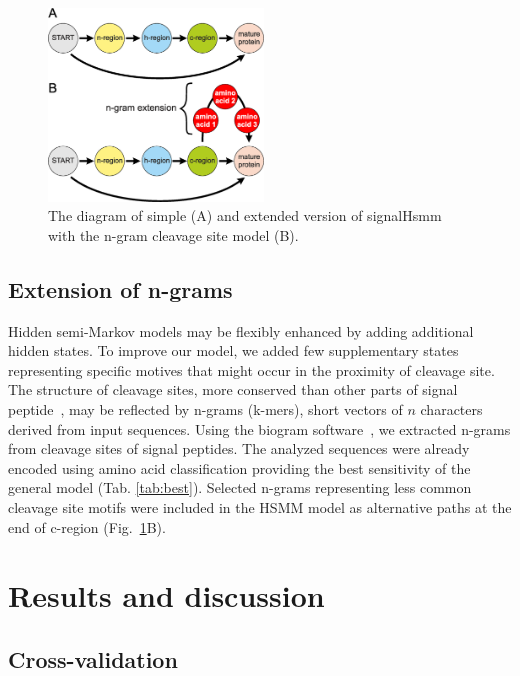 \documentclass[10pt,letterpaper]{article}
\begin{document}

\begin{figure}[ht]\centering
\includegraphics[width=0.51\textwidth]{figures/HSMMs.eps}
\caption{The diagram of simple (A) and extended version of signalHsmm with the n-gram cleavage site model (B).}
\label{fig:ngramext}
\end{figure}

    
\subsection*{Extension of n-grams}

Hidden semi-Markov models may be flexibly enhanced by adding additional hidden states. To improve our model, we added few supplementary states representing specific motives that might occur in the proximity of cleavage site. The structure of cleavage sites, more conserved than other parts of signal peptide~\cite{2004hillerpredisi}, may be reflected by n-grams (k-mers), short vectors of $n$ characters derived from input sequences. Using the biogram software~\cite{biogramPackage}, we extracted n-grams from cleavage sites of signal peptides. The analyzed sequences were already encoded using amino acid classification providing the best sensitivity of the general model (Tab. \ref{tab:best}). Selected n-grams representing less common cleavage site motifs were included in the HSMM model as alternative paths at the end of c-region (Fig.~\ref{fig:ngramext}B).


\section*{Results and discussion}

\subsection*{Cross-validation}
\end{document}

